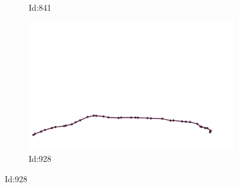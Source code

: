 \documentclass[12pt,twoside]{report}
\begin{document}
\begin{figure}
\begin{subfigure}[b]{0.20\textwidth}
\caption{Id:841}
\end{subfigure}
\begin{subfigure}[b]{0.20\textwidth}
\centering
\includegraphics[width=\textwidth]{../../trajectories/928.png}
\caption{Id:928}
\end{subfigure}
\end{figure}
\end{document}

